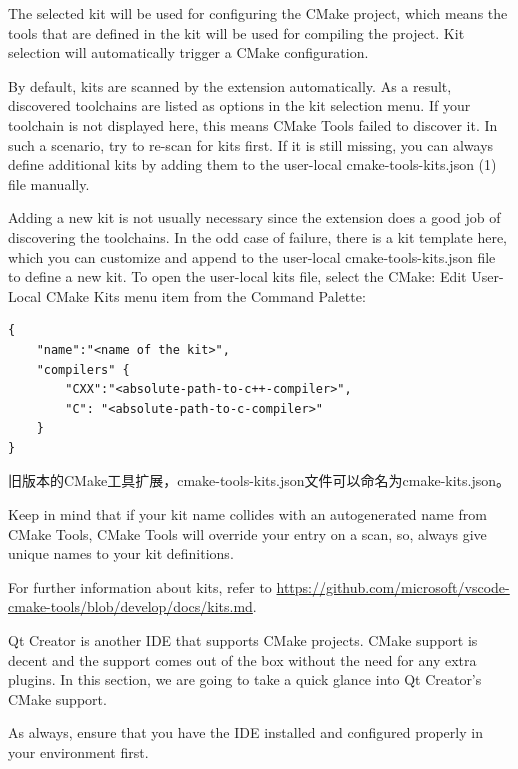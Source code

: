 The selected kit will be used for configuring the CMake project, which means the tools that are defined in the kit will be used for compiling the project. Kit selection will automatically trigger a CMake configuration.

By default, kits are scanned by the extension automatically. As a result, discovered toolchains are listed as options in the kit selection menu. If your toolchain is not displayed here, this means CMake Tools failed to discover it. In such a scenario, try to re-scan for kits first. If it is still missing, you can always define additional kits by adding them to the user-local cmake-tools-kits.json (1) file manually.

Adding a new kit is not usually necessary since the extension does a good job of discovering the toolchains. In the odd case of failure, there is a kit template here, which you can customize and append to the user-local cmake-tools-kits.json file to define a new kit. To open the user-local kits file, select the CMake: Edit User-Local CMake Kits menu item from the Command Palette:

\begin{lstlisting}[style=styleCMake]
{
	"name":"<name of the kit>",
	"compilers" {
		"CXX":"<absolute-path-to-c++-compiler>",
		"C": "<absolute-path-to-c-compiler>"
	}
}
\end{lstlisting}

\begin{tcolorbox}[colback=webgreen!5!white,colframe=webgreen!75!black,title=Note]
旧版本的CMake工具扩展，cmake-tools-kits.json文件可以命名为cmake-kits.json。
\end{tcolorbox}

Keep in mind that if your kit name collides with an autogenerated name from CMake Tools, CMake Tools will override your entry on a scan, so, always give unique names to your kit definitions.

For further information about kits, refer to \url{https://github.com/microsoft/vscode-cmake-tools/blob/develop/docs/kits.md}.


Qt Creator is another IDE that supports CMake projects. CMake support is decent and the support comes out of the box without the need for any extra plugins. In this section, we are going to take a quick glance into Qt Creator's CMake support.

As always, ensure that you have the IDE installed and configured properly in your
environment first.

